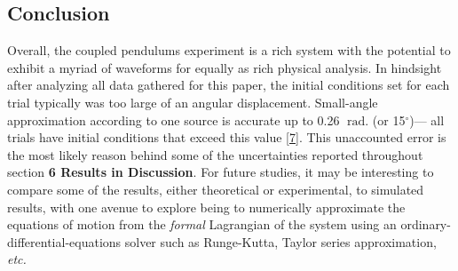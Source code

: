 \documentclass[12pt]{article}
\newcommand{\radian}{\;\mathrm{rad.}}
\begin{document}
\begin{multicols}{2}
\subsection{Conclusion}
Overall, the coupled pendulums experiment is a rich system with the potential to exhibit a myriad of waveforms for equally as rich physical analysis.
In hindsight after analyzing all data gathered for this paper, the initial conditions set for each trial typically was too large of an angular displacement.
Small-angle approximation according to one source is accurate up to 0.26 $\radian$ (or 15$^\circ$)---
all trials have initial conditions that exceed this value [\hyperref[sec:7]{7}].
This unaccounted error is the most likely reason behind some of the uncertainties reported throughout section \textbf{6 Results in Discussion}.
For future studies, it may be interesting to compare some of the results, either theoretical or experimental, to simulated results,
with one avenue to explore being to numerically approximate the equations of motion from the \textit{formal} Lagrangian of the system using an ordinary-differential-equations solver such as Runge-Kutta, Taylor series approximation, \textit{etc.}

\end{multicols}
\newpage
\end{document}
